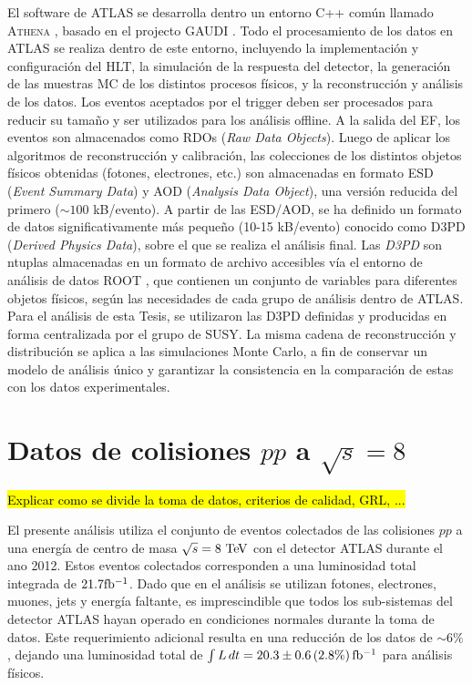 El software de ATLAS se desarrolla dentro un entorno C++ común llamado
\textsc{Athena} \cite{CompuTDR,Lenzi:1214931,Calafiura:865624}, basado en el projecto GAUDI \cite{Gaudi}. Todo el
procesamiento de los datos en ATLAS se realiza dentro de este entorno,
incluyendo la implementación y configuración del HLT, la simulación de la
respuesta del detector, la generación de las muestras MC de los distintos
procesos físicos, y la reconstrucción y análisis de los datos. Los eventos
aceptados por el trigger deben ser procesados para reducir su tamaño y ser
utilizados para los análisis offline. A la salida del EF, los eventos son
almacenados como RDOs (\emph{Raw Data Objects}). Luego de aplicar los algoritmos de
reconstrucción y calibración, las colecciones de los distintos objetos físicos
obtenidas (fotones, electrones, etc.) son almacenadas en formato ESD (\emph{Event
Summary Data}) y AOD (\emph{Analysis Data Object}), una versión reducida del primero
($\sim 100$ kB/evento). A partir de las ESD/AOD, se ha definido un formato de
datos significativamente más pequeño (10-15 kB/evento) conocido como D3PD
(\emph{Derived Physics Data}), sobre el que se realiza el análisis final. Las \emph{D3PD} son
ntuplas almacenadas en un formato de archivo accesibles vía el entorno de análisis de datos ROOT
\cite{Brun199781}, que contienen un conjunto de variables para diferentes objetos físicos,
según las necesidades de cada grupo de análisis dentro de ATLAS. Para el
análisis de esta Tesis, se utilizaron las D3PD definidas y producidas en forma
centralizada por el grupo de SUSY. La misma cadena de reconstrucción y
distribución se aplica a las simulaciones Monte Carlo, a fin de conservar un
modelo de análisis único y garantizar la consistencia en la comparación de estas
con los datos experimentales.



\section{Datos de colisiones $pp$ a $\sqrt{s} = 8$ \tev}

\hl{Explicar como se divide la toma de datos, criterios de calidad, GRL, ...}

El presente análisis utiliza el conjunto de eventos colectados de las colisiones
$pp$ a una energía de centro de masa $\sqrt{s} = 8\tev$ con el detector ATLAS
durante el ano 2012. Estos eventos colectados corresponden a una luminosidad
total integrada de $21.7 \mbox{fb$^{-1}$}$. Dado que en el análisis se utilizan fotones, electrones,
muones, jets y energía faltante, es imprescindible que todos los sub-sistemas
del detector ATLAS hayan operado en condiciones normales durante la toma
de datos. Este requerimiento adicional resulta en una reducción de los datos de
$\sim 6\%$, dejando una luminosidad total de $\int L\, dt = 20.3 \pm 0.6\, (2.8
\%) \, \mbox{fb$^{-1}$}$\cite{lumi2012} para análisis físicos.

